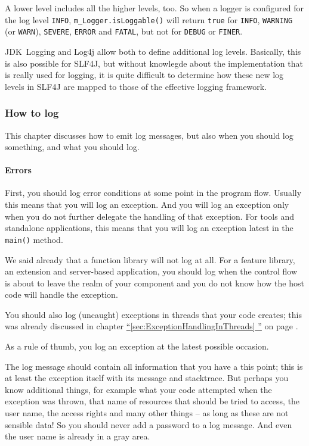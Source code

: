 \documentclass[11pt,a4paper, titlepage, parskip=half, headsepline, footsepline, cleardoublepage=current, headheight=1cm]{scrbook}
\newcommand*{\tqfullvref}[1]{\hyperref[{#1}]{“\ref*{#1} \nameref*{#1}”} on page \pageref{#1}}
\begin{document}
A lower level includes all the higher levels, too. So when a logger is configured for the log level \verb#INFO#, \lstinline|m_Logger.isLoggable()| will return \lstinline|true| for \verb#INFO#, \verb#WARNING# (or \verb#WARN#), \verb#SEVERE#, \verb#ERROR# and \verb#FATAL#, but not for \verb#DEBUG# or \verb#FINER#.

JDK~Logging and Log4j allow both to define additional log levels. Basically, this is also possible for SLF4J, but without knowlegde about the implementation that is really used for logging, it is quite difficult to determine how these new log levels in SLF4J are mapped to those of the effective logging framework.

\subsubsection{How to log}\label{sec:HowToLog}
This chapter discusses how to emit log messages, but also when you should log something, and what you should log.

\paragraph{Errors} First, you should log error conditions at some point in the program flow. Usually this means that you will log an exception. And you will log an exception only when you do not further delegate the handling of that exception. For tools and standalone applications, this means that you will log an exception latest in the \lstinline|main()| method.

We said already that a function library will not log at all. For a feature library, an extension and server-based application, you should log when the control flow is about to leave the realm of your component and you do not know how the host code will handle the exception.

You should also log (uncaught) exceptions in threads that your code creates; this was already discussed in chapter \tqfullvref{sec:ExceptionHandlingInThreads}.

As a rule of thumb, you log an exception at the latest possible occasion.

The log message should contain all information that you have a this point; this is at least the exception itself with its message and stacktrace. But perhaps you know additional things, for example what your code attempted when the exception was thrown, that name of resources that should be tried to access, the user name, the access rights and many other things – as long as these are not sensible data! So you should never add a password to a log message. And even the user name is already in a gray area.
\end{document}
